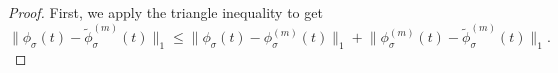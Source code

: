 \begin{proof}
    First, we apply the triangle inequality to get
    \begin{equation}
        \lVert \phi_{\sigma}(t) - \widetilde{\phi}_{\sigma}^{(m)}(t) \rVert _1
            \leq \lVert \phi_{\sigma}(t) - \phi_{\sigma}^{(m)}(t) \rVert _1 + \lVert \phi_{\sigma}^{(m)}(t) - \widetilde{\phi}_{\sigma}^{(m)}(t) \rVert _1.
    \end{equation}


\end{proof}
